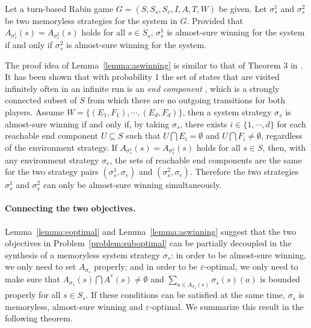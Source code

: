 \documentclass[runningheads,a4paper]{llncs}
\begin{document}
\begin{lemma}
Let a turn-based Rabin game $G = (S, S_s, S_e, I, A, T, W)$ be given. Let $\sigma_s^1$ and $\sigma_s^2$ be two memoryless strategies for the system in $G$. 
Provided that $A_{\sigma_s^1}(s) = A_{\sigma_s^2}(s)$ holds for all $s \in S_s$, $\sigma_s^1$ is almost-sure winning for the system if and only if $\sigma_s^2$ is almost-sure winning for the system.
\label{lemma:aswinning}
\end{lemma}

The proof idea of Lemma~\ref{lemma:aswinning} is similar to that of Theorem 3 in \cite{chatterjee2005complexity}. It has been shown that with probability $1$ the set of states that are visited infinitely often in an infinite run is an \emph{end component} \cite{de1997formal}, which is a strongly connected subset of $S$ from which there are no outgoing transitions for both players. Assume $W = \{(E_1, F_1), \cdots, (E_d, F_d)\}$, then a system strategy $\sigma_s$ is almost-sure winning if and only if, by taking $\sigma_s$, there exists $i \in \{1, \cdots, d\}$ for each reachable end component $U \subseteq S$ such that $U \bigcap E_i = \emptyset$ and $U \bigcap F_i \not= \emptyset$, regardless of the environment strategy. If $A_{\sigma_s^1}(s) = A_{\sigma_s^2}(s)$ holds for all $s \in S$, then, with any environment strategy $\sigma_e$, the sets of reachable end components are the same for the two strategy pairs $(\sigma_s^1, \sigma_e)$ and $(\sigma_s^2, \sigma_e)$. Therefore the two strategies $\sigma_s^1$ and $\sigma_s^2$ can only be almost-sure winning simultaneously. 




\paragraph{Connecting the two objectives.}
Lemma~\ref{lemma:eoptimal} and Lemma~\ref{lemma:aswinning} suggest that the two objectives in Problem~\ref{problem:suboptimal} can be partially decoupled in the synthesis of a memoryless system strategy $\sigma_s$: in order to be almost-sure winning, we only need to set $A_{\sigma_s}$ properly; and in order to be $\varepsilon$-optimal, we only need to make sure that $A_{\sigma_s}(s) \bigcap A^*(s) \not= \emptyset$ and $\sum_{a \in A_{\sigma_s}(s)} \sigma_s(s)(a)$ is bounded properly for all $s \in S_s$. If these conditions can be satisfied at the same time, $\sigma_s$ is memoryless, almost-sure winning and $\varepsilon$-optimal. We summarize this result in the following theorem. 
\end{document}
